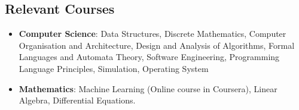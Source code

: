 \documentclass[margin, centered]{res}
\begin{document}
\begin{resume}
\section{Relevant \hspace{2mm} Courses}
\begin{itemize}[leftmargin=*]
\item  \textbf{Computer Science}: Data Structures, Discrete Mathematics, Computer Organisation and 
Architecture, Design and Analysis of Algorithms, Formal Languages and Automata Theory, Software
Engineering, Programming Language Principles, Simulation, Operating System
\item  \textbf{Mathematics}: Machine Learning (Online course in Coursera), Linear Algebra,
Differential Equations.
\end{itemize}


\end{resume}
\end{document}
